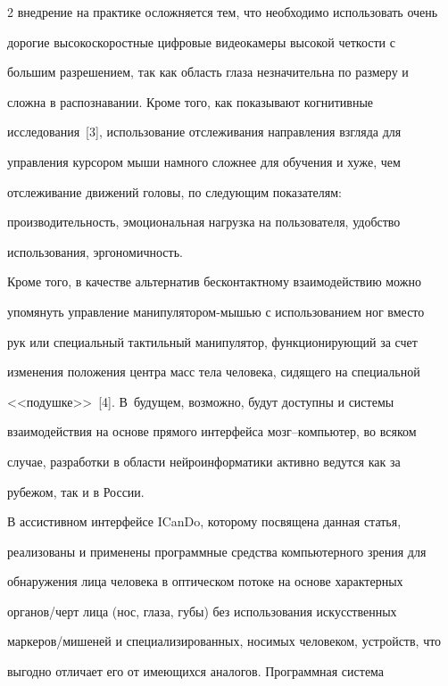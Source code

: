 \begin{multicols}{2}
внедрение на практике осложняется тем, что необходимо использовать очень 


дорогие высокоскоростные цифровые видеокамеры высокой четкости с 


большим разрешением, так как область глаза незначительна по размеру и 


сложна в распознавании. Кроме того, как показывают когнитивные 


исследования~[3], использование отслеживания направления взгляда для 


управления курсором мыши намного сложнее для обучения и хуже, чем 


отслеживание движений головы, по следующим показателям: 


производительность, эмоциональная нагрузка на пользователя, удобство 


использования, эргономичность.


  


  Кроме того, в качестве альтернатив бесконтактному взаимодействию можно 


упомянуть управление манипулятором-мышью с использованием ног вместо 


рук или специальный тактильный манипулятор, функционирующий за счет 


изменения положения центра масс тела человека, сидящего на специальной 


<<подушке>>~[4]. В~будущем, возможно, будут доступны и системы 


взаимодействия на основе прямого интерфейса мозг--ком\-пьютер, во всяком 


случае, разработки в области нейроинформатики активно ведутся как за 


рубежом, так и в России.


  


  В ассистивном интерфейсе ICanDo, которому посвящена данная статья, 


реализованы и применены программные средства компьютерного зрения для 


обнаружения лица человека в оптическом потоке на основе характерных 


органов/черт лица (нос, глаза, губы) без использования искусственных 


маркеров/мишеней и специализированных, носимых человеком, устройств, что 


выгодно отличает его от имеющихся аналогов. Программная система 



\end{multicols}
